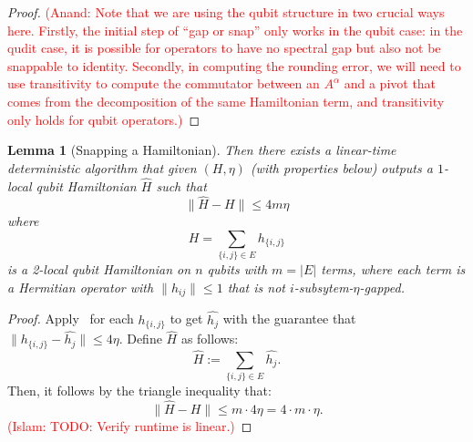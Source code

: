 \documentclass[11pt]{article}
\theoremstyle{plain}
\newtheorem{lemma}[theorem]{Lemma}
\newcommand{\AnandNote}[1]{\textcolor{red}{(Anand: #1)}}
\newcommand{\IslamNote}[1]{\textcolor{red}{(Islam: #1)}}
\newcommand{\AnandNote}[1]{}
\newcommand{\IslamNote}[1]{}
\begin{document}
\begin{proof}
\AnandNote{Note that we are using the qubit structure in two crucial ways here. Firstly, the initial step of ``gap or snap'' only works in the qubit case: in the qudit case, it is possible for operators to have no spectral gap but also not be snappable to identity. Secondly, in computing the rounding error, we will need to use transitivity to compute the commutator between an $A^\alpha$ and a pivot that comes from the decomposition of the same Hamiltonian term, and transitivity only holds for qubit operators.}
\end{proof}

\begin{lemma}[Snapping a Hamiltonian]
\label{lemma:snapping-hamiltonian}
Then there exists a linear-time deterministic algorithm that given $(H, \eta)$ (with properties below) outputs a $1$-local qubit Hamiltonian $\widehat{H}$ such that
\begin{equation}
    \|\widehat{H} - H\| \leq 4 m \eta
\end{equation}
where \[ H = \sum_{\{i,j\} \in E} h_{\{i,j\}}\]
is a 2-local qubit Hamiltonian on $n$ qubits with $m = |E|$ terms, where each term is a Hermitian operator with $\| h_{ij} \| \leq 1$ that is not $i$-subsytem-$\eta$-gapped. 
\end{lemma}
\begin{proof}
    Apply~ for each $h_{\{i,j\}}$ to get $\widehat{h_{j}}$ with the guarantee that $\|h_{\{i,j\}} - \widehat{h_{j}}\| \leq 4 \eta$. Define $\widehat{H}$ as follows:
    \begin{equation}
        \widehat{H} := \sum\limits_{\{i,j\} \in E} \widehat{h_j}.
    \end{equation}
    Then, it follows by the triangle inequality that:
    \begin{equation}
        \|\widehat{H} - H\| \leq m \cdot 4 \eta = 4 \cdot m \cdot \eta.
    \end{equation}
    \IslamNote{TODO: Verify runtime is linear.}
\end{proof}
\end{document}

